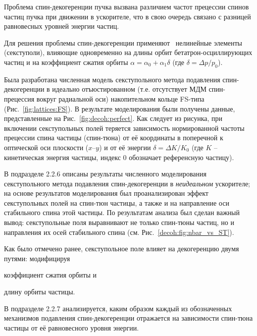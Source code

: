 Проблема спин-декогеренции пучка вызвана различием частот прецессии спинов частиц пучка 
при движении в ускорителе, что в свою очередь связано с разницей равновесных уровней энергии частиц. 

Для решения проблемы спин-декогеренции применяют~\cite{COSY:SCT:IPAC15, COSY:SCT:1000sec} 
нелинейные элементы (секступоли), влияющие одновременно на длины орбит бетатрон-осциллирующих частиц  
и на коэффициент сжатия орбиты ${\alpha = \alpha_0 + \alpha_1\delta}$ (где ${\delta=\Delta p/p_0}$).

Была разработана численная модель секступольного метода подавления спин-декогеренции 
в идеально отъюстированном (т.е. отсутствует МДМ спин-прецессия вокруг радиальной оси) накопительном кольце 
FS-типа (Рис.~\ref{fig:lattices:FS}). В результате моделирования были получены данные, представленные на Рис.~\ref{fig:decoh:perfect}. Как следует из рисунка, при включении секступольных полей теряется зависимость
нормированной частоты прецессии спина частицы (спин-тюна) от её координаты в поперечной к оптической оси
 плоскости ($x$--$y$) и от её энергии $\delta = \Delta K/K_0$ 
 (где $K$ -- кинетическая энергия частицы, индекс 0 обозначает референсную частицу).
 
 В подразделе 2.2.6 описаны результаты численного моделирования секступольного метода 
 подавления спин-декогеренции в \emph{неидеальном} ускорителе; 
 на основе результатов моделирования был проанализирован
 эффект секступольных полей на спин-тюн частицы, а также и на направление оси стабильного спина этой частицы. 
 По результатам анализа был сделан важный вывод: секступольные поля выравнивают не только спин-тюны
 частиц, но и направления их осей стабильного спина (см. Рис.~\ref{decoh:fig:nbar_vs_ST}).
 
 Как было отмечено ранее, секступольное поле влияет на декогеренцию двумя путями: 
 модифицируя 
 \begin{enumerate*}[(1)] 
 	\item коэффициент сжатия орбиты и 
 	\item длину орбиты частицы.
 \end{enumerate*}
 В подразделе 2.2.7 анализируется, каким образом каждый из обозначенных механизмов 
 подавления спин-декогеренции отражается на зависимости спин-тюна частицы
 от её равновесного уровня энергии.

